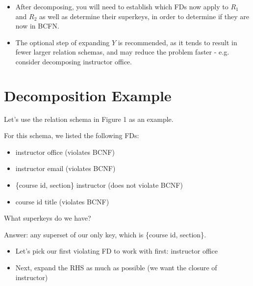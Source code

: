 \documentclass{../cheatsheet}
\begin{document}
\begin{multicols*}{2}
\begin{itemize}
    \item After decomposing, you will need to establish which FDs now apply to
        $R_1$ and $R_2$ as well as determine their superkeys, in order to
        determine if they are now in BCFN.

    \item The optional step of expanding $Y$ is recommended, as it tends to
        result in fewer larger relation schemas, and may reduce the problem
        faster - e.g. consider decomposing instructor \textrightarrow office.
\end{itemize}

\section{Decomposition Example}
Let's use the relation schema in Figure 1 as an example.

For this schema, we listed the following FDs:

\begin{itemize}
    \item instructor \textrightarrow office (violates BCNF)
    \item instructor \textrightarrow email (violates BCNF)
    \item \{course id, section\} \textrightarrow instructor (does not violate
        BCNF)
    \item course id \textrightarrow title (violates BCNF)
\end{itemize}

What superkeys do we have?

Answer: any superset of our only key, which is \{course id, section\}.

\begin{itemize}
    \item Let's pick our first violating FD to work with first: instructor
        \textrightarrow office
    \item Next, expand the RHS as much as possible (we want the closure of
        instructor)


\end{itemize}
\end{multicols*}
\end{document}
